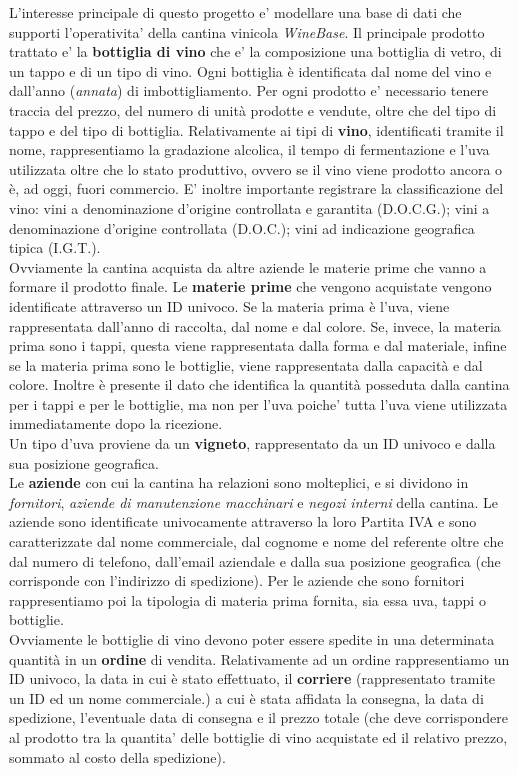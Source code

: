 L'interesse principale di questo progetto e' modellare una base di dati che supporti l'operativita' della cantina vinicola \emph{WineBase}. Il principale prodotto trattato e' la \textbf{bottiglia di vino} che e' la composizione una bottiglia di vetro, di un tappo e di un tipo di vino. Ogni bottiglia è identificata dal nome del vino e dall'anno (\emph{annata}) di imbottigliamento. Per ogni prodotto e' necessario tenere traccia del prezzo, del numero di unità prodotte e vendute, oltre che del tipo di tappo e del tipo di bottiglia.
Relativamente ai tipi di \textbf{vino}, identificati tramite il nome, rappresentiamo la gradazione alcolica, il tempo di fermentazione e l'uva utilizzata oltre che lo stato produttivo, ovvero se il vino viene prodotto ancora o è, ad oggi, fuori commercio. E' inoltre importante registrare la classificazione del vino: vini a denominazione d'origine controllata e garantita (D.O.C.G.); vini a denominazione d'origine controllata (D.O.C.); vini ad indicazione geografica tipica (I.G.T.).\\ Ovviamente la cantina acquista da altre aziende le materie prime che vanno a formare il prodotto finale. Le \textbf{materie prime} che vengono acquistate vengono identificate attraverso un ID univoco. Se la materia prima è l'uva, viene rappresentata dall'anno di raccolta, dal nome e dal colore. Se, invece, la materia prima sono i tappi, questa viene rappresentata dalla forma e dal materiale, infine se la materia prima sono le bottiglie, viene rappresentata dalla capacità e dal colore. Inoltre è presente il dato che identifica la quantità posseduta dalla cantina per i tappi e per le bottiglie, ma non per l'uva poiche' tutta l'uva viene utilizzata immediatamente dopo la ricezione.\\
Un tipo d'uva proviene da un \textbf{vigneto}, rappresentato da un ID univoco e dalla sua posizione geografica. \\
Le \textbf{aziende} con cui la cantina ha relazioni sono molteplici, e si dividono in \emph{fornitori}, \emph{aziende di manutenzione macchinari} e \emph{negozi interni} della cantina. Le aziende sono identificate univocamente attraverso la loro Partita IVA e sono caratterizzate dal nome commerciale, dal cognome e nome del referente oltre che dal numero di telefono, dall'email aziendale e dalla sua posizione geografica (che corrisponde con l'indirizzo di spedizione). Per le aziende che sono fornitori rappresentiamo poi la tipologia di materia prima fornita, sia essa uva, tappi o bottiglie.\\
Ovviamente le bottiglie di vino devono poter essere spedite in una determinata quantità in un \textbf{ordine} di vendita. Relativamente ad un ordine rappresentiamo un ID univoco, la data in cui è stato effettuato, il \textbf{corriere} (rappresentato tramite un ID ed un nome commerciale.) a cui è stata affidata la consegna, la data di spedizione, l'eventuale data di consegna e il prezzo totale (che deve corrispondere al prodotto tra la quantita' delle bottiglie di vino acquistate ed il relativo prezzo, sommato al costo della spedizione).\\
